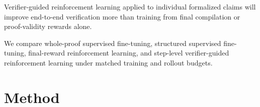 \documentclass[sigconf,anonymous]{aamas}
\begin{document}

Verifier-guided reinforcement learning applied to individual formalized claims
will improve end-to-end verification more than training from final compilation or proof-validity rewards alone.

We compare whole-proof supervised
fine-tuning, structured supervised fine-tuning, final-reward reinforcement
learning, and step-level verifier-guided reinforcement learning under matched
training and rollout budgets.

\section{Method}
\end{document}
